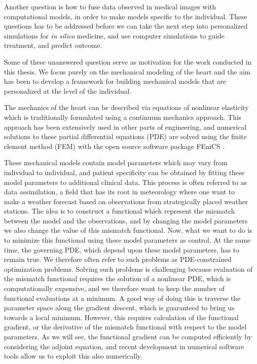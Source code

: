 Another question is how to fuse data observed in medical images with
computational models, in order to make models specific to the
individual. These questions has to be addressed before we can take the
next step into personalized simulations for \emph{in silico} medicine,
and use computer simulations to guide treatment, and predict outcome.



Some of these unanswered question serve as motivation for the work
conducted in this thesis. We focus purely on the mechanical modeling
of the heart and the aim has been to develop a framework for
building mechanical models that are personalized at the level of the
individual.

The mechanics of the heart can be described via equations of nonlinear
elasticity which is traditionally formulated using a continuum
mechanics approach. This approach has been extensively used in other
parts of engineering, and numerical solutions to these partial
differential equations (PDE) are solved using the finite element
method (FEM) with the open source software package FEniCS \cite{logg2012automated}.

These mechanical models contain model parameters which may vary from
individual to individual, and patient specificity can be obtained by
fitting these model parameters to additional clinical data. This
process is often referred to as data assimilation, a field that has
its root in meteorology where one want to make a weather forecast based
on observations from strategically placed weather stations. The idea
is to construct a functional which represent the mismatch between the
model and the observations, and by changing the model parameters we
also change the value of this mismatch functional. Now, what we want to do is to
minimize this functional using these model parameters as control. At
the same time, the governing PDE, which depend upon these model
parameters, has to remain true. We therefore often
refer to such problems as PDE-constrained optimization problems.  
Solving such problems is challenging because evaluation of the
mismatch functional requires the solution of a nonlinear PDE, which is
computationally expensive, and we therefore want to keep the number of
functional evaluations at a minimum. A good way of doing this is
traverse the parameter space along the gradient descent, which is
guaranteed to bring us towards a local minimum. However, this requires
calculation of the functional gradient, or the derivative of the
mismatch functional with respect to the model parameters. As we will
see, the functional gradient can be computed efficiently by
considering the adjoint equation, and recent development in numerical
software tools \cite{farrell2013automated} allow us to exploit this
also numerically.


